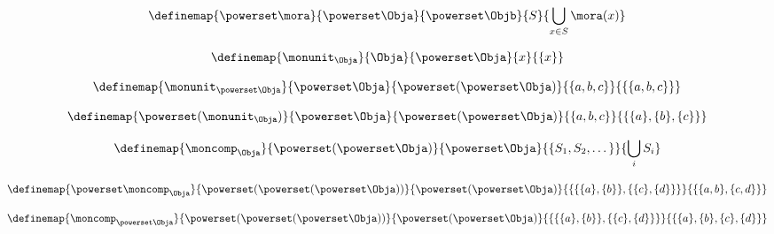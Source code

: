 \begin{exercise}
\end{exercise}
\begin{solution}
\end{solution}


\begin{equation}\label{eq:monad-power-functor}
  \definemap{
    \powerset \mora 
  }{
    \powerset \Obja
  }{
    \powerset \Objb
  }{
    S
  }{
  \bigcup_{x\in S} \mora(x)
  }
\end{equation}

\begin{equation}\label{eq:monad-power-monunit}
  \definemap{
    \monunit_\Obja
  }{
    \Obja
  }{
    \powerset\Obja
  }{
    x
  }{
    \{ x \}
  }
\end{equation}


\begin{equation}\label{eq:monad-power-monunit-power}
  \definemap{
    \monunit_{\powerset \Obja}
  }{
    \powerset \Obja
  }{
    \powerset (\powerset\Obja)
  }{
    \{a, b, c\} 
  }{
    \{ \{a, b, c \} \}
  }
\end{equation}


\begin{equation}\label{eq:monad-power-power-monunit}
  \definemap{
    \powerset(\monunit_\Obja)
  }{
    \powerset \Obja
  }{
    \powerset (\powerset\Obja)
  }{
    \{a, b, c\} 
  }{
     \{ \{a\}, \{ b\}, \{c\} \} 
  }
\end{equation}


\begin{equation}\label{eq:monad-power-moncomp}
  \definemap{
    \moncomp_{\Obja}
  }{
    \powerset (\powerset\Obja)
  }{
    \powerset \Obja
  }{
    \{S_1, S_2, \dots \} 
  }{
     \bigcup_i  S_i
  }
\end{equation}


\begin{equation}\label{eq:monad-power-power-moncomp}
  \definemap{
    \powerset \moncomp_{\Obja}
  }{
    \powerset (\powerset (\powerset\Obja))
  }{
    \powerset (\powerset \Obja)
  }{
    \{  \{   \{a\}, \{b\} \} , \{ \{c\}, \{d\} \}\}
  }{
     \{  \{ a, b \}, \{ c, d \} \}
  }
\end{equation}


\begin{equation}\label{eq:monad-power-moncomp-power}
  \definemap{
    \moncomp_{\powerset \Obja}
  }{
    \powerset (\powerset (\powerset\Obja))
  }{
    \powerset (\powerset \Obja)
  }{
    \{  \{   \{a\}, \{b\} \} , \{ \{c\}, \{d\} \}\}
  }{
    \{    \{a\}, \{b\}  ,  \{c\}, \{d\}  \}
  }
\end{equation}


